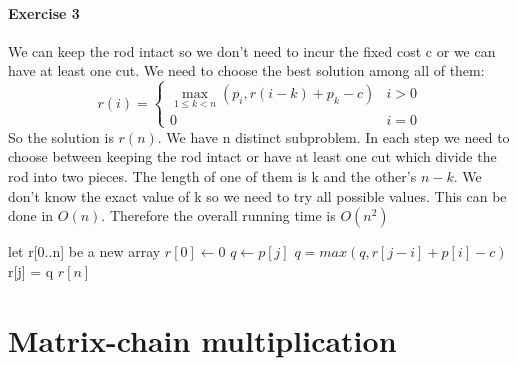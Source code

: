 \documentclass{book}
\begin{document}
	\paragraph{Exercise 3}
	We can keep the rod intact so we don't need to incur the fixed cost c or we can have at least one cut. We need to choose the best solution among all of them:
	\begin{equation*}
	r(i) = \begin{cases}
	\max\limits_{1 \leq k < n}(p_i, r(i - k) + p_k - c) & i > 0 \\
	0 & i = 0
	\end{cases}
	\end{equation*}
	So the solution is $r(n)$. We have n distinct subproblem. In each step we need to choose between keeping the rod intact or have at least one cut which divide the rod into two pieces. The length of one of them is k and the other's $n - k$. We don't know the exact value of k so we need to try all possible values. This can be done in $O(n)$. Therefore the overall running time is $O(n^2)$
	
	\begin{algorithm}
		\begin{algorithmic}[1]
			\State let r[0..n] be a new array
			\State $r[0] \gets 0$
			\State $q \gets p[j]$
			\State $q = max(q, r[j - i] + p[i] - c)$
			\EndFor
			\State r[j] = q
			\EndFor
			\State \Return $r[n]$
			\EndFunction
		\end{algorithmic}
	\end{algorithm}
	\section{Matrix-chain multiplication}
\end{document}
